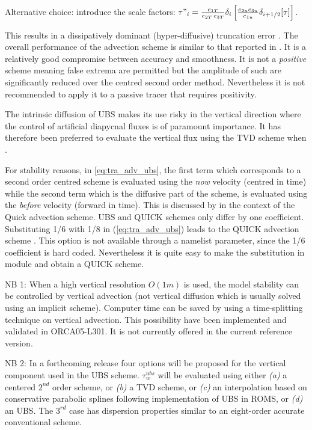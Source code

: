 \documentclass[../main/NEMO_manual]{subfiles}
\begin{document}
Alternative choice: introduce the scale factors:  
$\tau "_i =\frac{e_{1T}}{e_{2T}\,e_{3T}}\delta_i \left[ \frac{e_{2u} e_{3u} }{e_{1u} }\delta_{i+1/2}[\tau] \right]$.

This results in a dissipatively dominant (\ie hyper-diffusive) truncation error
\citep{Shchepetkin_McWilliams_OM05}.
The overall performance of the advection scheme is similar to that reported in \cite{Farrow1995}.
It is a relatively good compromise between accuracy and smoothness.
It is not a \emph{positive} scheme meaning false extrema are permitted but
the amplitude of such are significantly reduced over the centred second order method.
Nevertheless it is not recommended to apply it to a passive tracer that requires positivity. 

The intrinsic diffusion of UBS makes its use risky in the vertical direction where
the control of artificial diapycnal fluxes is of paramount importance.
It has therefore been preferred to evaluate the vertical flux using the TVD scheme when
.

For stability reasons, in \autoref{eq:tra_adv_ubs}, the first term which corresponds to
a second order centred scheme is evaluated using the \textit{now} velocity (centred in time) while
the second term which is the diffusive part of the scheme, is evaluated using the \textit{before} velocity
(forward in time).
This is discussed by \citet{Webb_al_JAOT98} in the context of the Quick advection scheme.
UBS and QUICK schemes only differ by one coefficient.
Substituting 1/6 with 1/8 in (\autoref{eq:tra_adv_ubs}) leads to the QUICK advection scheme \citep{Webb_al_JAOT98}.
This option is not available through a namelist parameter, since the 1/6 coefficient is hard coded.
Nevertheless it is quite easy to make the substitution in  module and obtain a QUICK scheme.

NB 1: When a high vertical resolution $O(1m)$ is used, the model stability can be controlled by vertical advection
(not vertical diffusion which is usually solved using an implicit scheme).
Computer time can be saved by using a time-splitting technique on vertical advection.
This possibility have been implemented and validated in ORCA05-L301.
It is not currently offered in the current reference version. 

NB 2: In a forthcoming release four options will be proposed for the vertical component used in the UBS scheme.
$\tau_w^{ubs}$ will be evaluated using either \textit{(a)} a centered $2^{nd}$ order scheme,
or \textit{(b)} a TVD scheme, or \textit{(c)} an interpolation based on conservative parabolic splines following
\citet{Shchepetkin_McWilliams_OM05} implementation of UBS in ROMS, or \textit{(d)} an UBS.
The $3^{rd}$ case has dispersion properties similar to an eight-order accurate conventional scheme.
\end{document}
